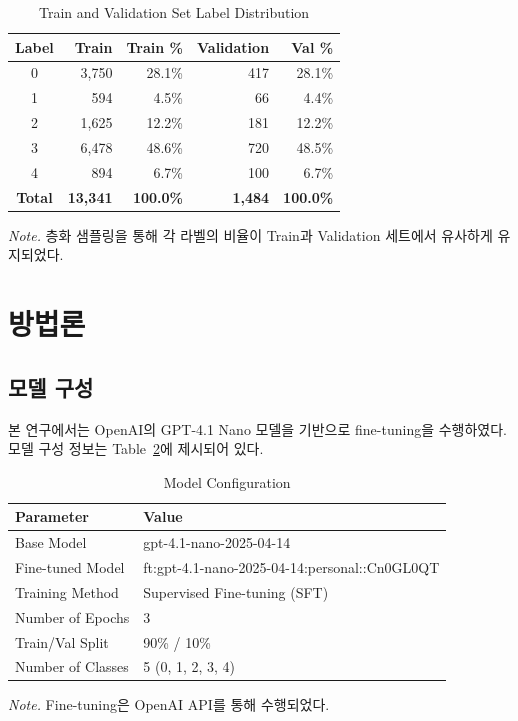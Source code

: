 \documentclass[12pt, a4paper]{article}
\begin{document}
\begin{table}[H]
\centering
\caption{Train and Validation Set Label Distribution}
\label{tab:train_val_split}
\begin{tabular}{crrrr}
\toprule
\textbf{Label} & \textbf{Train} & \textbf{Train \%} & \textbf{Validation} & \textbf{Val \%} \\
\midrule
0 & 3,750 & 28.1\% & 417 & 28.1\% \\
1 & 594 & 4.5\% & 66 & 4.4\% \\
2 & 1,625 & 12.2\% & 181 & 12.2\% \\
3 & 6,478 & 48.6\% & 720 & 48.5\% \\
4 & 894 & 6.7\% & 100 & 6.7\% \\
\midrule
\textbf{Total} & \textbf{13,341} & \textbf{100.0\%} & \textbf{1,484} & \textbf{100.0\%} \\
\bottomrule
\end{tabular}

\vspace{0.5em}
\footnotesize\textit{Note.} 층화 샘플링을 통해 각 라벨의 비율이 Train과 Validation 세트에서 유사하게 유지되었다.
\end{table}

\section{방법론}

\subsection{모델 구성}
본 연구에서는 OpenAI의 GPT-4.1 Nano 모델을 기반으로 fine-tuning을 수행하였다.
모델 구성 정보는 Table~\ref{tab:model_config}에 제시되어 있다.

\begin{table}[H]
\centering
\caption{Model Configuration}
\label{tab:model_config}
\begin{tabular}{ll}
\toprule
\textbf{Parameter} & \textbf{Value} \\
\midrule
Base Model & gpt-4.1-nano-2025-04-14 \\
Fine-tuned Model & ft:gpt-4.1-nano-2025-04-14:personal::Cn0GL0QT \\
Training Method & Supervised Fine-tuning (SFT) \\
Number of Epochs & 3 \\
Train/Val Split & 90\% / 10\% \\
Number of Classes & 5 (0, 1, 2, 3, 4) \\
\bottomrule
\end{tabular}

\vspace{0.5em}
\footnotesize\textit{Note.} Fine-tuning은 OpenAI API를 통해 수행되었다.
\end{table}
\end{document}
